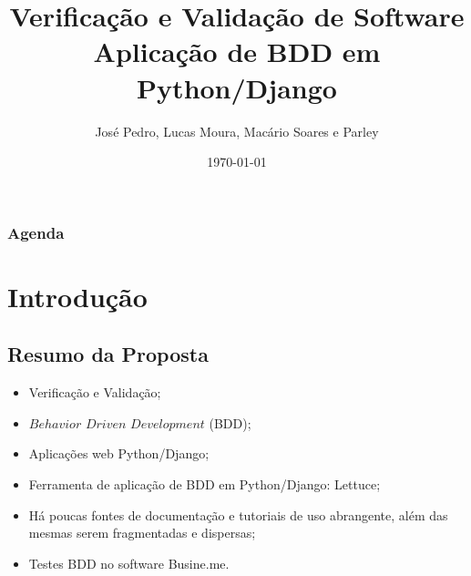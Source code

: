 \documentclass{beamer}
\title[Aplicação de BDD em Python/Django]{Verificação e Validação de Software \\
Aplicação de BDD em Python/Django} %
\author{José Pedro, Lucas Moura, Macário Soares e Parley} %
\institute[UnB] %
{
Universidade de Brasília \\ %
\medskip
}
\date{\today} %
\begin{document}
\begin{frame}
\titlepage %
\end{frame}

\begin{frame}
\frametitle{Agenda} %
\tiny \begin{multicols}{2}
  \tableofcontents
\end{multicols}%
\end{frame}



\section{Introdução}
\subsection{Resumo da Proposta}
\begin{frame}
  \begin{itemize}
      \item Verificação e Validação;
      \item $Behavior$ $Driven$ $Development$ (BDD);
      \item Aplicações web Python/Django;
      \item Ferramenta de aplicação de BDD em Python/Django: Lettuce;
      \item Há poucas fontes de documentação e tutoriais de uso abrangente, além
das mesmas serem fragmentadas e dispersas;
      \item Testes BDD no software Busine.me.
  \end{itemize}
\end{frame}
\end{document}
